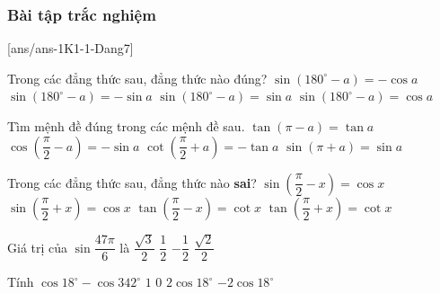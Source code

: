 \subsubsection{Bài tập trắc nghiệm}
[ans/ans-1K1-1-Dang7]
\begin{ex}%
	Trong các đẳng thức sau, đẳng thức nào đúng?
	\choice
	{$\sin\left(180^\circ-a\right)=-\cos a$}
	{$\sin\left(180^\circ-a\right)=-\sin a$}
	{\True $\sin\left(180^\circ-a\right)=\sin a$}
	{$\sin\left(180^\circ-a\right)=\cos a$}
\end{ex}

\begin{ex}%
	Tìm mệnh đề đúng trong các mệnh đề sau.
	\choice
	{$\tan \left(\pi - a\right)=\tan a$}
	{$\cos \left(\dfrac{\pi}{2} - a\right)=-\sin a$}
	{\True $\cot \left(\dfrac{\pi}{2} + a\right)=-\tan a$}
	{$\sin\left(\pi + a\right)= \sin a$}
\end{ex}

\begin{ex}%
	Trong các đẳng thức sau, đẳng thức nào \textbf{sai}?
	\choice
	{$\sin\left(\dfrac{\pi}{2}-x\right)=\cos x$}
	{$\sin\left(\dfrac{\pi}{2}+x\right)=\cos x$}
	{$\tan\left(\dfrac{\pi}{2}-x\right)=\cot x$}
	{\True $\tan\left(\dfrac{\pi}{2}+x\right)=\cot x$}
\end{ex}

\begin{ex}%
	Giá trị của $\sin \dfrac{47\pi}{6}$ là
	\choice
	{$\dfrac{\sqrt{3}}{2}$}
	{$\dfrac{1}{2}$}
	{\True $-\dfrac{1}{2}$}
	{$\dfrac{\sqrt{2}}{2}$}
\end{ex}

\begin{ex}%
	Tính $\cos 18^{\circ}-\cos 342^{\circ}$
	\choice
	{$1$}
	{\True $0$}
	{$2\cos 18^{\circ}$}
	{$-2\cos 18^{\circ}$}
\end{ex}

